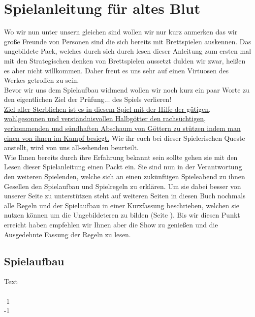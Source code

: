 \documentclass[11pt,a5paper,twoside,openright]{book}
\begin{document}
\newpage






\section*{Spielanleitung für altes Blut}
\label{AnleitungAlt}
Wo wir nun unter unsern gleichen sind wollen wir nur kurz anmerken das wir große Freunde von Personen sind die sich bereits mit Brettspielen auskennen. Das ungebildete Pack, welches durch sich durch lesen dieser Anleitung zum ersten mal mit den Strategischen denken von Brettspielen aussetzt dulden wir zwar, heißen es aber nicht willkommen. Daher freut es uns sehr auf einen Virtuosen des Werkes getroffen zu sein.\\

Bevor wir uns dem Spielaufbau widmend wollen wir noch kurz ein paar Worte zu den eigentlichen Ziel der Prüfung... des Spiels verlieren!\\
\ul{Ziel aller Sterblichen ist es in diesem Spiel mit der Hilfe der gütigen, wohlgesonnen und verständnisvollen Halbgötter den rachsüchtigen, verkommenden und sündhaften Abschaum von Göttern zu stützen indem man einen von ihnen im Kampf besiegt.} Wie ihr euch bei dieser Spielerischen Queste anstellt, wird von uns all-sehenden beurteilt.\\

Wie Ihnen bereits durch ihre Erfahrung bekannt sein sollte gehen sie mit den Lesen dieser Spielanleitung einen Packt ein. Sie sind nun in der Verantwortung den weiteren Spielenden, welche sich an einen zukünftigen Spieleabend zu ihnen Gesellen den Spielaufbau und Spielregeln zu erklären. Um sie dabei besser von unserer Seite zu unterstützen steht auf weiteren Seiten in diesen Buch nochmals alle Regeln und der Spielaufbau in einer Kurzfassung beschrieben, welchen sie nutzen können um die Ungebildeteren zu bilden (Seite \textbf{\pageref{ZusammenfassungFlasch}}). Bis wir diesen Punkt erreicht haben empfehlen wir Ihnen aber die Show zu genießen und die Ausgedehnte Fassung der Regeln zu lesen.  

\subsection*{Spielaufbau}

Text\\
\pageref{ZusammenfassungFlasch}\\
\pageref{ZusammenfassungFlasch}-1\\
\the\numexpr\value{page}-1\relax\
\end{document}
